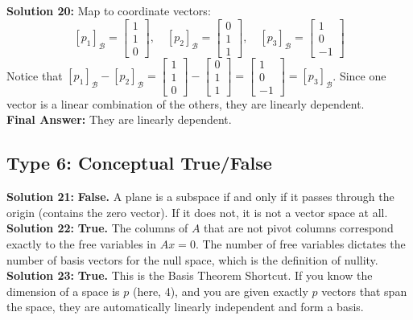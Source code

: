 \documentclass{article}
\begin{document}
\textbf{Solution 20:}
Map to coordinate vectors:
$$ [p_1]_\mathcal{B} = \begin{bmatrix} 1 \\ 1 \\ 0 \end{bmatrix}, \quad [p_2]_\mathcal{B} = \begin{bmatrix} 0 \\ 1 \\ 1 \end{bmatrix}, \quad [p_3]_\mathcal{B} = \begin{bmatrix} 1 \\ 0 \\ -1 \end{bmatrix} $$
Notice that $[p_1]_\mathcal{B} - [p_2]_\mathcal{B} = \begin{bmatrix} 1 \\ 1 \\ 0 \end{bmatrix} - \begin{bmatrix} 0 \\ 1 \\ 1 \end{bmatrix} = \begin{bmatrix} 1 \\ 0 \\ -1 \end{bmatrix} = [p_3]_\mathcal{B}$.
Since one vector is a linear combination of the others, they are linearly dependent. \\
\textbf{Final Answer:} They are linearly dependent. \\

\subsection*{Type 6: Conceptual True/False}
\textbf{Solution 21:} \textbf{False.} A plane is a subspace if and only if it passes through the origin (contains the zero vector). If it does not, it is not a vector space at all. \\

\textbf{Solution 22:} \textbf{True.} The columns of $A$ that are not pivot columns correspond exactly to the free variables in $Ax = 0$. The number of free variables dictates the number of basis vectors for the null space, which is the definition of nullity. \\

\textbf{Solution 23:} \textbf{True.} This is the Basis Theorem Shortcut. If you know the dimension of a space is $p$ (here, 4), and you are given exactly $p$ vectors that span the space, they are automatically linearly independent and form a basis. \\
\end{document}

